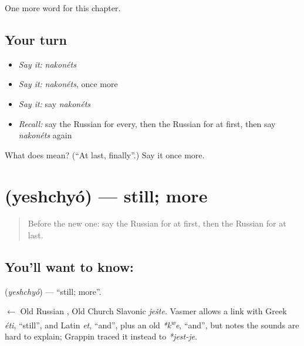 \begin{grammarlens}[title={What you've built}]
One more word for this chapter.
\end{grammarlens}

\subsection*{Your turn}
\begin{itemize}
\raggedright
  \item \emph{Say it:} \emph{nakonéts}
  \item \emph{Say it:} \emph{nakonéts}, once more
  \item \emph{Say it:} say \emph{nakonéts}
  \item \emph{Recall:} say the Russian for every, then the Russian for at first, then say \emph{nakonéts} again
\end{itemize}

\begin{tcolorbox}[breakable,colback=teal!4,colframe=teal!35!black,title={Before you move on}]
What does  mean? (\textquotedblleft{}At last, finally\textquotedblright{}.) Say it once more.
\end{tcolorbox}
\section[\texorpdfstring{\ru{ещё} (yeshchyó)}{ещё (yeshchyó)}]{ (yeshchyó) — still; more}

\label{lesson:RU-C150-yeshchyo}



\begin{quote}
Before the new one: say the Russian for at first, then the Russian for at last.
\end{quote}

\subsection*{You'll want to know: }
\textbf{} (\emph{yeshchyó}) — \textquotedblleft{}still; more\textquotedblright{}.

\begin{cousinweb}
\textbf{} $\leftarrow$ Old Russian \emph{}, Old Church Slavonic \emph{ješte}. Vasmer allows a link with Greek \emph{éti}, \textquotedblleft{}still\textquotedblright{}, and Latin \emph{et}, \textquotedblleft{}and\textquotedblright{}, plus an old \emph{*k\textsuperscript{w}e}, \textquotedblleft{}and\textquotedblright{}, but notes the sounds are hard to explain; Grappin traced it instead to \emph{*jest-je}.
\end{cousinweb}


